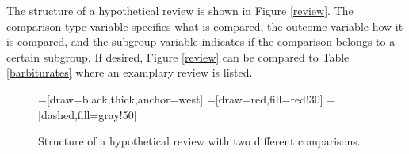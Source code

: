 \documentclass[11pt,a4paper,twoside]{book}\usepackage[]{graphicx}\usepackage[]{color}
\begin{document}
The structure of a hypothetical review is shown in Figure \ref{review}. 
The comparison type variable specifies what is compared, the outcome variable how it is compared, and the subgroup variable indicates if the comparison belongs to a certain subgroup. If desired, Figure \ref{review} can be compared to Table \ref{barbiturates} where an examplary review is listed.

\begin{figure}
=[draw=black,thick,anchor=west]
=[draw=red,fill=red!30]
=[dashed,fill=gray!50]
\caption{Structure of a hypothetical review with two different comparisons.}
\label{review.structure}
\end{figure}
\end{document}
